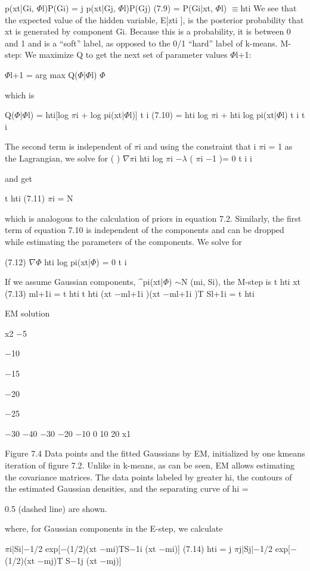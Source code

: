 p(xt|Gi, $\Phi$l)P(Gi) = j p(xt|Gj, $\Phi$l)P(Gj) (7.9) = P(Gi|xt, $\Phi$l) $\equiv$hti We see that the expected value of the hidden variable, E[zti ], is the posterior probability that xt is generated by component Gi. Because this is a probability, it is between 0 and 1 and is a “soft” label, as opposed to the 0/1 “hard” label of k-means. M-step: We maximize Q to get the next set of parameter values $\Phi$l+1:

$\Phi$l+1 = arg max Q($\Phi$|$\Phi$l) $\Phi$

which is

Q($\Phi$|$\Phi$l) = hti[log $\pi$i + log pi(xt|$\Phi$l)] t i (7.10) = hti log $\pi$i + hti log pi(xt|$\Phi$l) t i t i

The second term is independent of $\pi$i and using the constraint that i $\pi$i = 1 as the Lagrangian, we solve for ( ) $\nabla$$\pi$i hti log $\pi$i $-$$\lambda$ ( $\pi$i $-$1 )= 0 t i i

and get

t hti (7.11) $\pi$i = N

which is analogous to the calculation of priors in equation 7.2. Similarly, the first term of equation 7.10 is independent of the components and can be dropped while estimating the parameters of the components. We solve for

(7.12) $\nabla$$\Phi$ hti log pi(xt|$\Phi$) = 0 t i

If we assume Gaussian components, \textasciicircum{}pi(xt|$\Phi$) $\sim$N (mi, Si), the M-step is t hti xt (7.13) ml+1i = t hti t hti (xt $-$ml+1i )(xt $-$ml+1i )T Sl+1i = t hti

EM solution

x2 $-$5

$-$10

$-$15

$-$20

$-$25

$-$30 $-$40 $-$30 $-$20 $-$10 0 10 20 x1

Figure 7.4 Data points and the fitted Gaussians by EM, initialized by one kmeans iteration of figure 7.2. Unlike in k-means, as can be seen, EM allows estimating the covariance matrices. The data points labeled by greater hi, the contours of the estimated Gaussian densities, and the separating curve of hi =

0.5 (dashed line) are shown.

where, for Gaussian components in the E-step, we calculate

$\pi$i|Si|$-$1/2 exp[$-$(1/2)(xt $-$mi)TS$-$1i (xt $-$mi)] (7.14) hti = j $\pi$j|Sj|$-$1/2 exp[$-$(1/2)(xt $-$mj)T S$-$1j (xt $-$mj)]

